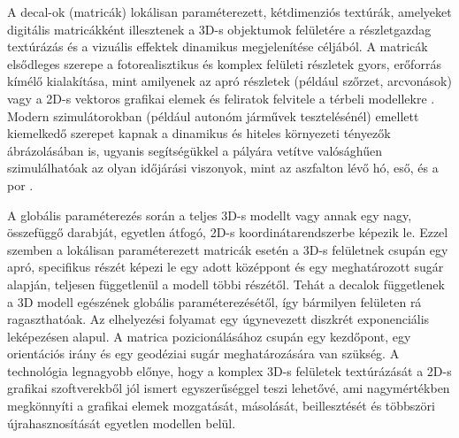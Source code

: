 A decal-ok (matricák) lokálisan paraméterezett, kétdimenziós textúrák, amelyeket digitális matricákként illesztenek a 3D-s objektumok felületére a részletgazdag textúrázás és a vizuális effektek dinamikus megjelenítése céljából. A matricák elsődleges szerepe a fotorealisztikus és komplex felületi részletek gyors, erőforrás kímélő kialakítása, mint amilyenek az apró részletek (például szőrzet, arcvonások) vagy a 2D-s vektoros grafikai elemek és feliratok felvitele a térbeli modellekre \cite{schmidtInteractiveDecalCompositing2006}. Modern szimulátorokban (például autonóm járművek tesztelésénél) emellett kiemelkedő szerepet kapnak a dinamikus és hiteles környezeti tényezők ábrázolásában is, ugyanis segítségükkel a pályára vetítve valósághűen szimulálhatóak az olyan időjárási viszonyok, mint az aszfalton lévő hó, eső, és a por \cite{turkcanBoundlessGeneratingPhotorealistic2024}.

A globális paraméterezés során a teljes 3D-s modellt vagy annak egy nagy, összefüggő darabját, egyetlen átfogó, 2D-s koordinátarendszerbe képezik le. Ezzel szemben a lokálisan paraméterezett matricák esetén a 3D-s felületnek csupán egy apró, specifikus részét képezi le egy adott középpont és egy meghatározott sugár alapján, teljesen függetlenül a modell többi részétől. Tehát a decalok függetlenek a 3D modell egészének globális paraméterezésétől, így bármilyen felületen rá ragaszthatóak. Az elhelyezési folyamat egy úgynevezett diszkrét exponenciális leképezésen alapul. A matrica pozicionálásához csupán egy kezdőpont, egy orientációs irány és egy geodéziai sugár meghatározására van szükség. A technológia legnagyobb előnye, hogy a komplex 3D-s felületek textúrázását a 2D-s grafikai szoftverekből jól ismert egyszerűséggel teszi lehetővé, ami nagymértékben megkönnyíti a grafikai elemek mozgatását, másolását, beillesztését és többszöri újrahasznosítását egyetlen modellen belül. \cite{schmidtInteractiveDecalCompositing2006}











































